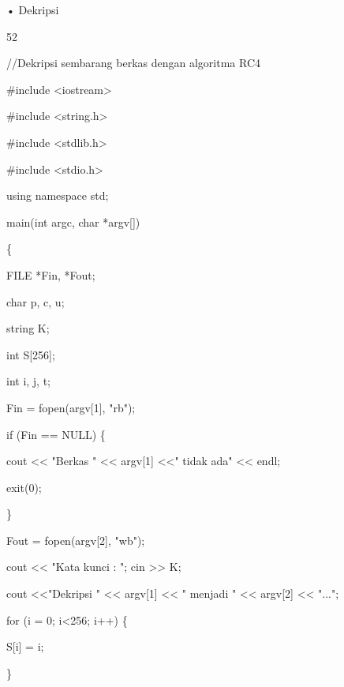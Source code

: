 \documentclass{article}
\begin{document}

• Dekripsi

52

//Dekripsi sembarang berkas dengan algoritma RC4

\#include <iostream>

\#include <string.h>

\#include <stdlib.h>

\#include <stdio.h>

using namespace std;

main(int argc, char *argv[])

\{

 FILE *Fin, *Fout;

 char p, c, u;

 string K;

 int S[256];

 int i, j, t; 


Fin = fopen(argv[1], "rb");

 if (Fin == NULL) \{

   cout << "Berkas " << argv[1] <<" tidak ada" << endl;

   exit(0);

 \}


 Fout = fopen(argv[2], "wb");

 cout << "Kata kunci : "; cin >> K; 

 cout <<"Dekripsi " << argv[1] << " menjadi " << argv[2] << "..."; 


 for (i = 0; i<256; i++) \{

  S[i] = i;

 \}
\end{document}
